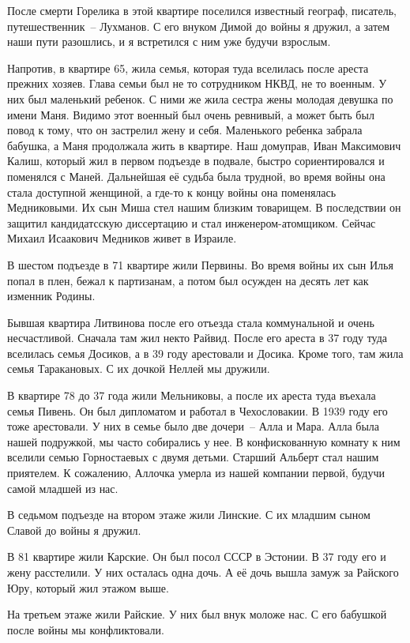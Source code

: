 После смерти Горелика в этой квартире поселился известный географ, писатель, путешественник~-- Лухманов.
С его внуком Димой до войны я дружил, а затем наши пути разошлись, и я встретился с ним уже будучи взрослым.

Напротив, в квартире 65, жила семья, которая туда вселилась после ареста прежних хозяев. Глава семьи был не то сотрудником НКВД, не то военным. У них был маленький ребенок. С ними же жила сестра жены молодая девушка по имени Маня. Видимо этот военный был очень ревнивый, а может быть был повод к тому, что он застрелил жену и себя. Маленького ребенка забрала бабушка, а Маня продолжала жить в квартире. Наш домуправ, Иван Максимович Калиш, который жил в первом подъезде в подвале, быстро сориентировался и поменялся с Маней. Дальнейшая её судьба была трудной, во время войны она стала доступной женщиной, а где-то к концу войны она поменялась Медниковыми. Их сын Миша стел нашим близким товарищем. В последствии он защитил кандидатсскую диссертацию и стал инженером-атомщиком. Сейчас Михаил Исаакович Медников живет в Израиле.

В шестом подъезде в 71 квартире жили Первины. Во время войны их сын Илья попал в плен, бежал к партизанам, а потом был осужден на десять лет как изменник Родины.

Бывшая квартира Литвинова после его отъезда стала коммунальной и очень несчастливой. Сначала там жил некто Райвид. После его ареста в 37 году туда вселилась семья Досиков, а в 39 году арестовали и Досика. Кроме того, там жила семья Таракановых. С их дочкой Неллей мы дружили.

В квартире 78 до 37 года жили Мельниковы, а после их ареста туда въехала семья Пивень. Он был дипломатом и работал в Чехословакии. В 1939 году его тоже арестовали. У них в семье было две дочери~-- Алла и Мара. Алла была нашей подружкой, мы часто собирались у нее. В конфискованную комнату к ним вселили семью Горностаевых с двумя детьми. Старший Альберт стал нашим приятелем. К сожалению, Аллочка умерла из нашей компании первой, будучи самой младшей из нас.

В седьмом подъезде на втором этаже жили Линские. С их младшим сыном Славой до войны я дружил.

В 81 квартире жили Карские. Он был посол СССР в Эстонии. В 37 году его и жену расстелили. У них осталась одна дочь. А её дочь вышла замуж за Райского Юру, который жил этажом выше.

На третьем этаже жили Райские. У них был внук моложе нас. С его бабушкой после войны мы конфликтовали.

